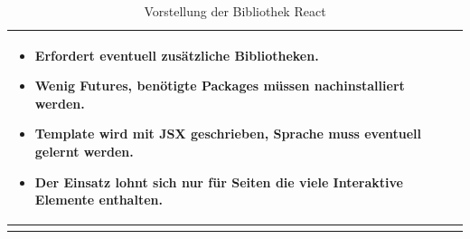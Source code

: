 \begin{longtable}{|l|l|l|}
{	\begin{itemize}
		\itemsep0pt
		\item Erfordert eventuell zusätzliche Bibliotheken. \cite{AngularReactVergleich}
		\item Wenig Futures, benötigte Packages müssen nachinstalliert werden. \cite{AngularReactVergleich}
		\item Template wird mit JSX geschrieben, Sprache muss eventuell gelernt werden. \cite{AngularReactVergleich7}
		\item Der Einsatz lohnt sich nur für Seiten die viele Interaktive Elemente enthalten. \cite{AngularReactVergleich3}
	\end{itemize}} \\
	\hline
		\caption{Vorstellung der Bibliothek React}
	\label{tab:react}
\end{longtable}






